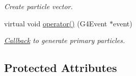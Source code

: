 \begin{DoxyCompactItemize}
\begin{DoxyCompactList}\small\item\em Create particle vector. \item\end{DoxyCompactList}\item 
virtual void \hyperlink{class_d_d4hep_1_1_simulation_1_1_geant4_input_action_abda8423a68e04eec20eb52c01883c0ba}{operator()} (G4Event $\ast$event)
\begin{DoxyCompactList}\small\item\em \hyperlink{class_d_d4hep_1_1_callback}{Callback} to generate primary particles. \item\end{DoxyCompactList}\end{DoxyCompactItemize}
\subsection*{Protected Attributes}
